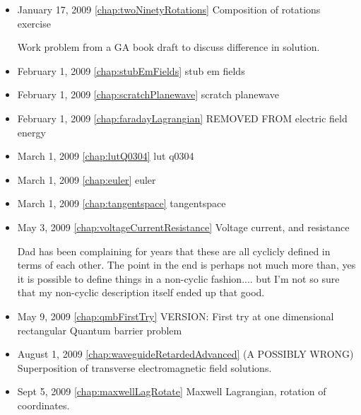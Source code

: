 \begin{itemize}
\item January 17, 2009 \ref{chap:twoNinetyRotations} Composition of rotations exercise

Work problem from a GA book draft to discuss difference in solution. \item February 1, 2009 \ref{chap:stubEmFields} stub em fields

\item February 1, 2009 \ref{chap:scratchPlanewave} scratch planewave

\item February 1, 2009 \ref{chap:faradayLagrangian} REMOVED FROM electric field energy

\item March 1, 2009 \ref{chap:lutQ0304} lut q0304

\item March 1, 2009 \ref{chap:euler} euler

\item March 1, 2009 \ref{chap:tangentspace} tangentspace

\item May 3, 2009 \ref{chap:voltageCurrentResistance} Voltage current, and resistance

Dad has been complaining for years that these are all cyclicly defined in terms of each other.  The point in the end is perhaps not much more than, yes it is possible to define things in a non-cyclic fashion.... but I'm not so sure that my non-cyclic description itself ended up that good. \item May 9, 2009 \ref{chap:qmbFirstTry} VERSION: First try at one dimensional rectangular Quantum barrier problem

\item August 1, 2009 \ref{chap:waveguideRetardedAdvanced} (A POSSIBLY WRONG) Superposition of transverse electromagnetic field solutions.

\item Sept 5, 2009 \ref{chap:maxwellLagRotate} Maxwell Lagrangian, rotation of coordinates.

\end{itemize}
